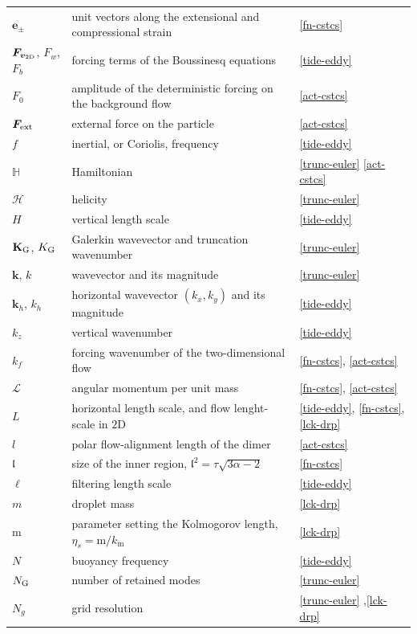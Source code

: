 \begin{longtable}{@{}p{}p{}p{}@{}}
$\boldsymbol{e}_\pm$ & unit vectors along the extensional and compressional strain & \ref{fn-cstcs} \\
$\boldsymbol{F}_{\boldsymbol{v}_{\rm 2D}}$, $F_w$, $F_b$ & forcing terms of the Boussinesq equations & \ref{tide-eddy} \\
$F_0$ & amplitude of the deterministic forcing on the background flow & \ref{act-cstcs} \\
$\boldsymbol{F}_{\rm ext}$ & external force on the particle & \ref{act-cstcs} \\
$f$ & inertial, or Coriolis, frequency & \ref{tide-eddy} \\
$\mathbb{H}$ & Hamiltonian& \ref{trunc-euler}  \ref{act-cstcs}  \\
$\mathcal{H}$ & helicity & \ref{trunc-euler} \\
$H$ & vertical length scale & \ref{tide-eddy} \\
$\mathbf{K}_{\rm G}$, $K_{\rm G}$ & Galerkin wavevector and truncation wavenumber & \ref{trunc-euler} \\
$\mathbf{k}$, $k$ & wavevector and its magnitude & \ref{trunc-euler} \\
$\boldsymbol{k}_h$, $k_h$ & horizontal wavevector $(k_x,k_y)$ and its magnitude & \ref{tide-eddy} \\
$k_z$ & vertical wavenumber & \ref{tide-eddy} \\
$k_f$ & forcing wavenumber of the two-dimensional flow & \ref{fn-cstcs}, \ref{act-cstcs} \\
$\mathscr{L}$ & angular momentum per unit mass & \ref{fn-cstcs}, \ref{act-cstcs} \\
$L$ & horizontal length scale, and flow lenght-scale in $2$D & \ref{tide-eddy}, \ref{fn-cstcs}, \ref{lck-drp} \\
$l$ & polar flow-alignment length of the dimer & \ref{act-cstcs} \\
$\mathfrak{l}$ & size of the inner region, $\mathfrak{l}^2 = \tau\sqrt{3\alpha-2}$ & \ref{fn-cstcs} \\
$\ell$ & filtering length scale & \ref{tide-eddy} \\
$m$ & droplet mass & \ref{lck-drp} \\
$\mathrm{m}$ & parameter setting the Kolmogorov length, $\eta_s = \mathrm{m}/k_{\mathrm{m}}$ & \ref{lck-drp} \\
$N$ & buoyancy frequency & \ref{tide-eddy} \\
$N_{\rm G}$ & number of retained modes & \ref{trunc-euler} \\
$N_g$ & grid resolution & \ref{trunc-euler} ,\ref{lck-drp} \\

\end{longtable}
